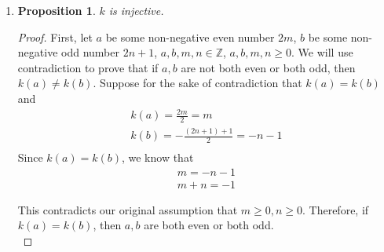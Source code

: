 \documentclass{article}
\newtheorem{prop}[thm]{Proposition}
\begin{document}
\begin{enumerate}
\begin{enumerate}
\begin{proof}
    For all $(x, y) \in \mathbb{R}^2$ and $xy = 1$, $x,y \neq 0$ because if $x = 0$ or $y = 0$ then $xy = 0 \neq 1$. \\
    
    Suppose that $h(a_1, b_1) = h(a_2, b_2)$. Since $a_1b_1 = a_2b_2 = 1$ and $a_1, a_2 \neq 0$, we can assume that $b_1 = \frac{1}{a_1}, b_2 = \frac{1}{a_2}$. Since $h(a_1,b_1) = h(a_2,b_2)$, we know that $a_1 = a_2$. Since $a_1 = a_2$, we have $b_1 = \frac{1}{a_1} = \frac{1}{a_2} = b_2$. \\
    
    Therefore, $h$ is injective by definition.
    \end{proof}
    
    \begin{prop}
      $h$ is surjective.
    \end{prop}
    \begin{proof}
    Let $c \in \mathbb{R}$. We will prove that there exist $(a, b) \in \mathbb{R}^2$ such that $h(a, b) = c$. \\
    
    Let $c = a$. Since $h(a, b) = a$, we know that $h(a, b) = c$ \\
    
    Therefore, $h$ is surjective by definition.
    \end{proof}
    
    \item 
    \begin{prop}
      $k$ is injective.
    \end{prop}
    \begin{proof}
    First, let $a$ be some non-negative even number $2m$, $b$ be some non-negative odd number $2n + 1$, $a,b,m,n \in \mathbb{Z}$, $a, b, m, n \geq 0$. We will use contradiction to prove that if $a,b$ are not both even or both odd, then $k(a) \neq k(b)$. Suppose for the sake of contradiction that $k(a) = k(b)$ and 
    \begin{gather}
        k(a) = \frac{2m}{2} = m \\
        k(b) = -\frac{(2n+1)+1}{2} = -n - 1 \\
    \end{gather}
    Since $k(a) = k(b)$, we know that
    \begin{gather}
        m = -n - 1 \\
        m + n = -1
    \end{gather}
    
    This contradicts our original assumption that $m \geq 0, n \geq 0$. Therefore, if $k(a) = k(b)$, then $a, b$ are both even or both odd. \\
    

\end{proof}
\end{enumerate}
\end{enumerate}
\end{document}
